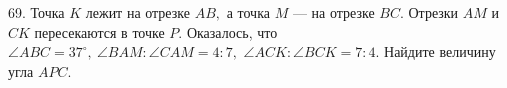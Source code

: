 69. Точка $K$ лежит на отрезке $AB,$ а точка $M$ --- на отрезке $BC.$ Отрезки $AM$ и $CK$ пересекаются в точке $P.$ Оказалось, что $\angle ABC=37^\circ,\ \angle BAM : \angle CAM=4:7,$ $\angle ACK: \angle BCK=7:4.$ Найдите величину угла $APC.$\\
